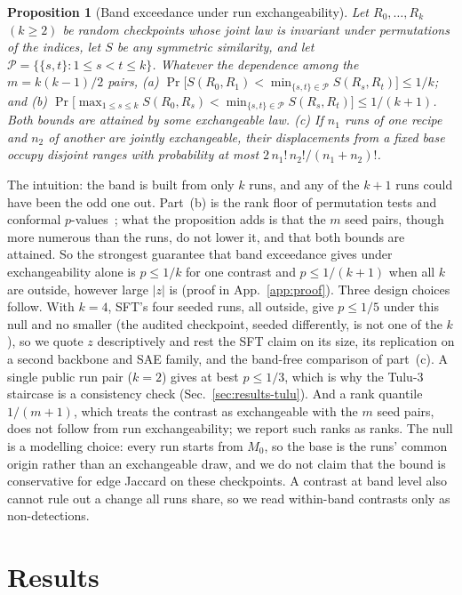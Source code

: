 \documentclass{article}
\newtheorem{proposition}{Proposition}
\begin{document}
\begin{proposition}[Band exceedance under run exchangeability]\label{prop:band}
Let $R_0,\dots,R_k$ $(k\ge2)$ be random checkpoints whose joint law is invariant under permutations of the indices, let $S$ be any symmetric similarity, and let $\mathcal P=\{\{s,t\}:1\le s<t\le k\}$. Whatever the dependence among the $m=k(k-1)/2$ pairs,
\textup{(a)} $\Pr\big[S(R_0,R_1)<\min_{\{s,t\}\in\mathcal P}S(R_s,R_t)\big]\le 1/k$; and
\textup{(b)} $\Pr\big[\max_{1\le s\le k}S(R_0,R_s)<\min_{\{s,t\}\in\mathcal P}S(R_s,R_t)\big]\le 1/(k+1)$.
Both bounds are attained by some exchangeable law. \textup{(c)} If $n_1$ runs of one recipe and $n_2$ of another are jointly exchangeable, their displacements from a fixed base occupy disjoint ranges with probability at most $2\,n_1!\,n_2!/(n_1+n_2)!$.
\end{proposition}
The intuition: the band is built from only $k$ runs, and any of the $k+1$ runs could have been the odd one out. Part~(b) is the rank floor of permutation tests and conformal $p$-values~\citep{phipson2010permutation,angelopoulos2023conformal}; what the proposition adds is that the $m$ seed pairs, though more numerous than the runs, do not lower it, and that both bounds are attained. So the strongest guarantee that band exceedance gives under exchangeability alone is $p\le1/k$ for one contrast and $p\le1/(k+1)$ when all $k$ are outside, however large $|z|$ is (proof in App.~\ref{app:proof}). Three design choices follow. With $k=4$, SFT's four seeded runs, all outside, give $p\le1/5$ under this null and no smaller (the audited checkpoint, seeded differently, is not one of the $k$), so we quote $z$ descriptively and rest the SFT claim on its size, its replication on a second backbone and SAE family, and the band-free comparison of part~(c). A single public run pair ($k=2$) gives at best $p\le1/3$, which is why the Tulu-3 staircase is a consistency check (Sec.~\ref{sec:results-tulu}). And a rank quantile $1/(m+1)$, which treats the contrast as exchangeable with the $m$ seed pairs, does not follow from run exchangeability; we report such ranks as ranks. The null is a modelling choice: every run starts from $M_0$, so the base is the runs' common origin rather than an exchangeable draw, and we do not claim that the bound is conservative for edge Jaccard on these checkpoints. A contrast at band level also cannot rule out a change all runs share, so we read within-band contrasts only as non-detections.

\section{Results}
\label{sec:results}
\end{document}
